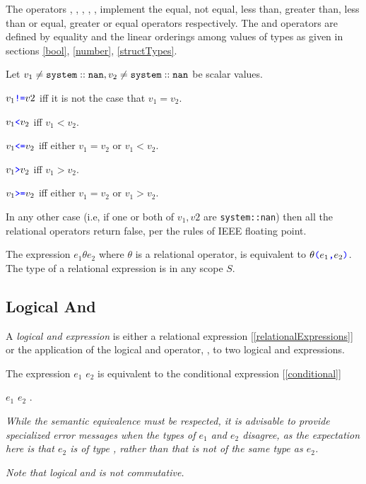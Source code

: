 \documentclass{article}
\begin{document}
{The operators \EQ{}, \NEQ{}, \LT{}, \GT{}, \LTE{}, \GTE{} implement the equal, not equal,  less than, greater than,  less than or equal, greater or equal operators respectively. The \EQ{} and \LT{} operators are defined by equality and the linear orderings among values of types as given in sections \ref{bool}, \ref{number}, \ref{structTypes}.

Let $v_1 \ne {\tt system::nan}, v_2 \ne {\tt system::nan}$ be scalar values. 

$v_1 \texttt{\color{blue} !=}{} v2$ iff it is not the case that $v_1 = v_2$.

$v_1 \texttt{\color{blue} \tt<}{} v_2$ iff $v_1 < v_2$.

$v_1 \texttt{\color{blue} \tt<=}{} v_2$ iff either $v_1 = v_2$ or $v_1 < v_2$.

$v_1 \texttt{\color{blue} \tt>}{} v_2$ iff $v_1 > v_2$.

$v_1 \texttt{\color{blue} \tt>=}{} v_2$ iff either $v_1 = v_2$ or $v_1 > v_2$.

In any other case (i.e, if one or both of $v_1, v2$ are {\tt system::nan}) then all the relational operators return false, per the rules of IEEE floating point.

\RelExpression{}
\RelOp{}

The expression $e_1 \theta e_2$ where $\theta$ is a relational operator, is equivalent to $\theta\texttt{\color{blue} (}{}e_1\texttt{\color{blue} ,}{} e_2\texttt{\color{blue} )}$. The type of a relational expression is  \BOOL{} in any scope $S$.


\subsection{Logical And}
\label{logicalAnd}

A {\em logical and expression} is either a relational expression [\ref{relationalExpressions}] or the application of the logical and operator, \AND{}, to two logical and expressions.

\AndExpression{}

The expression $e_1$ \AND{} $e_2$ is equivalent to the conditional expression [\ref{conditional}] 

\IF{} $e_1$ \THEN{} $e_2$ \ELSE{} \FALSE{}.

{\em While the semantic equivalence must be respected, it is advisable to provide specialized error messages when the types of $e_1$ and $e_2$ disagree,  as the expectation here is that $e_2$ is of type \BOOL{}, rather than that \FALSE{} is not of the same type as $e_2$.
}

{\em
Note that logical and is not commutative.
}

}
\end{document}
